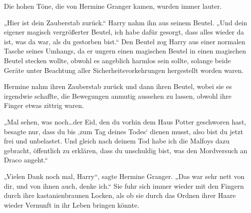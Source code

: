 Die hohen Töne, die von Hermine Granger kamen, wurden immer lauter.

„Hier ist dein Zauberstab zurück.“
Harry nahm ihn aus seinem Beutel.
„Und dein eigener magisch vergrößerter Beutel, ich habe dafür gesorgt, dass alles wieder da ist, was da war, als du gestorben bist.“
Den Beutel zog Harry aus einer normalen Tasche seines Umhangs, da er ungern einen magischen Beutel in einen magischen Beutel stecken wollte, obwohl es angeblich harmlos sein sollte, solange beide Geräte unter Beachtung aller Sicherheitsvorkehrungen hergestellt worden waren.

Hermine nahm ihren Zauberstab zurück und dann ihren Beutel, wobei sie es irgendwie schaffte, die Bewegungen anmutig aussehen zu lassen, obwohl ihre Finger etwas zittrig waren.

„Mal sehen, was noch…der Eid, den du vorhin dem Haus Potter geschworen hast, besagte nur, dass du bis ‚zum Tag deines Todes‘ dienen musst, also bist du jetzt frei und unbelastet. Und gleich nach deinem Tod habe ich die Malfoys dazu gebracht, öffentlich zu erklären, dass du unschuldig bist, was den Mordversuch an Draco angeht.“

„Vielen Dank noch mal, Harry“, sagte Hermine Granger. „Das war sehr nett von dir, und von ihnen auch, denke ich.“
Sie fuhr sich immer wieder mit den Fingern durch ihre kastanienbraunen Locken, als ob sie durch das Ordnen ihrer Haare wieder Vernunft in ihr Leben bringen könnte.

